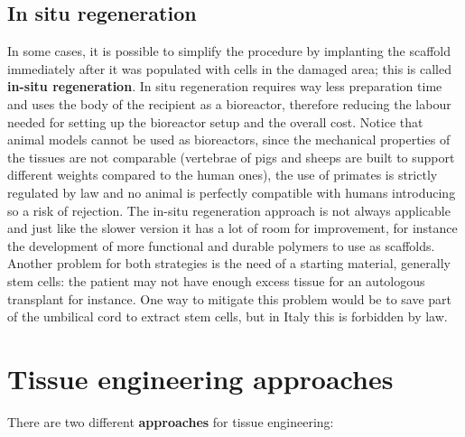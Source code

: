   \subsection{In situ regeneration}
  In some cases, it is possible to simplify the procedure by implanting the scaffold immediately after it was populated with cells in the damaged area; this is called \textbf{in-situ regeneration}.
  In situ regeneration requires way less preparation time and uses the body of the recipient as a bioreactor, therefore reducing the labour needed for setting up the bioreactor setup and the overall cost.
  Notice that animal models cannot be used as bioreactors, since the mechanical properties of the tissues are not comparable (vertebrae of pigs and sheeps are built to support different weights compared to the human ones), the use of primates is strictly regulated by law and no animal is perfectly compatible with humans introducing so a risk of rejection.
  The in-situ regeneration approach is not always applicable and just like the slower version it has a lot of room for improvement, for instance the development of more functional and durable polymers to use as scaffolds.
  Another problem for both strategies is the need of a starting material, generally stem cells: the patient may not have enough excess tissue for an autologous transplant for instance.
  One way to mitigate this problem would be to save part of the umbilical cord to extract stem cells, but in Italy this is forbidden by law.

\section{Tissue engineering approaches}
There are two different \textbf{approaches} for tissue engineering:

